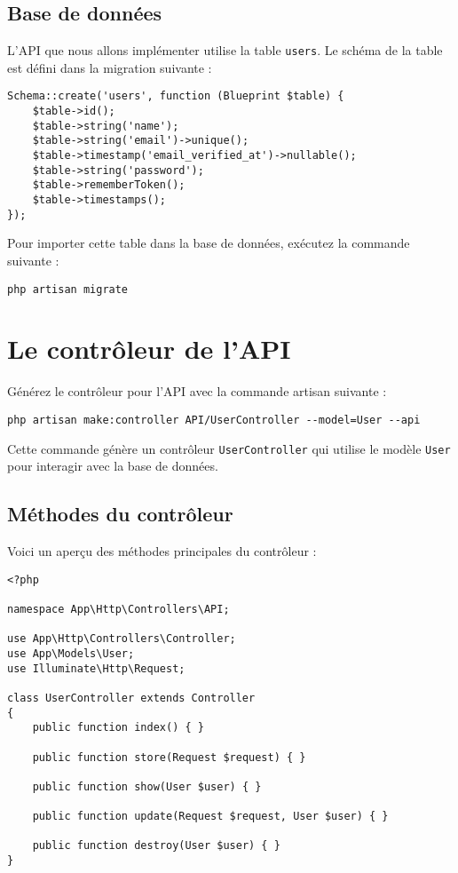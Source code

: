 \documentclass{article}
\begin{document}
\subsection{Base de données}

L'API que nous allons implémenter utilise la table \texttt{users}. Le schéma de la table est défini dans la migration suivante :

\begin{verbatim}
Schema::create('users', function (Blueprint $table) {
    $table->id();
    $table->string('name');
    $table->string('email')->unique();
    $table->timestamp('email_verified_at')->nullable();
    $table->string('password');
    $table->rememberToken();
    $table->timestamps();
});
\end{verbatim}

Pour importer cette table dans la base de données, exécutez la commande suivante :

\begin{verbatim}
php artisan migrate
\end{verbatim}

\section{Le contrôleur de l'API}

Générez le contrôleur pour l'API avec la commande artisan suivante :

\begin{verbatim}
php artisan make:controller API/UserController --model=User --api
\end{verbatim}

Cette commande génère un contrôleur \texttt{UserController} qui utilise le modèle \texttt{User} pour interagir avec la base de données.

\subsection{Méthodes du contrôleur}

Voici un aperçu des méthodes principales du contrôleur :

\begin{verbatim}
<?php

namespace App\Http\Controllers\API;

use App\Http\Controllers\Controller;
use App\Models\User;
use Illuminate\Http\Request;

class UserController extends Controller
{
    public function index() { }

    public function store(Request $request) { }

    public function show(User $user) { }

    public function update(Request $request, User $user) { }

    public function destroy(User $user) { }
}
\end{verbatim}
\end{document}
